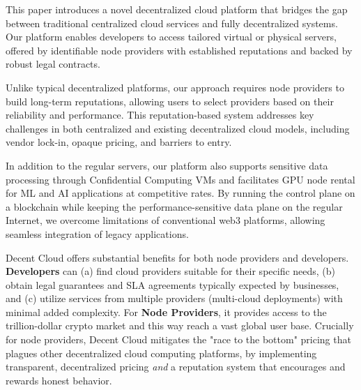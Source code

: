 This paper introduces a novel decentralized cloud platform that bridges the gap between traditional centralized cloud services and fully decentralized systems. Our platform enables developers to access tailored virtual or physical servers, offered by identifiable node providers with established reputations and backed by robust legal contracts.

Unlike typical decentralized platforms, our approach requires node providers to build long-term reputations, allowing users to select providers based on their reliability and performance. This reputation-based system addresses key challenges in both centralized and existing decentralized cloud models, including vendor lock-in, opaque pricing, and barriers to entry.

In addition to the regular servers, our platform also supports sensitive data processing through Confidential Computing VMs and facilitates GPU node rental for ML and AI applications at competitive rates. By running the control plane on a blockchain while keeping the performance-sensitive data plane on the regular Internet, we overcome limitations of conventional web3 platforms, allowing seamless integration of legacy applications.

Decent Cloud offers substantial benefits for both node providers and developers. {\bf Developers} can (a) find cloud providers suitable for their specific needs, (b) obtain legal guarantees and SLA agreements typically expected by businesses, and (c) utilize services from multiple providers (multi-cloud deployments) with minimal added complexity. For {\bf Node Providers}, it provides access to the trillion-dollar crypto market and this way reach a vast global user base. Crucially for node providers, Decent Cloud mitigates the "race to the bottom" pricing that plagues other decentralized cloud computing platforms, by implementing transparent, decentralized pricing {\em and} a reputation system that encourages and rewards honest behavior.
